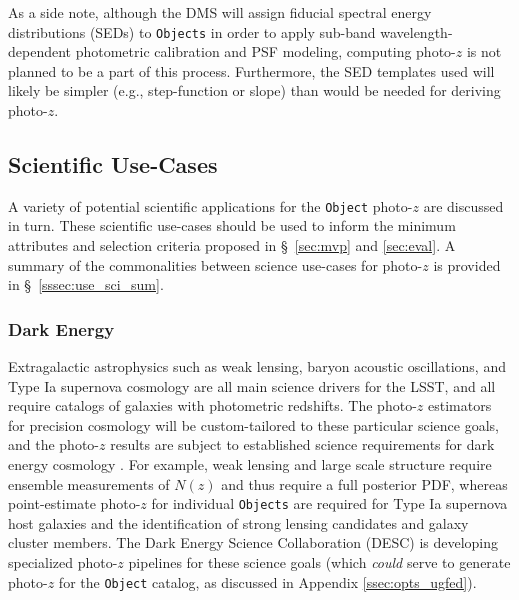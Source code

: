 \documentclass[DM,lsstdraft,toc]{lsstdoc}
\begin{document}
As a side note, although the DMS will assign fiducial spectral energy distributions (SEDs) to {\tt Objects} in order to apply sub-band wavelength-dependent photometric calibration and PSF modeling, computing photo-$z$ is not planned to be a part of this process.
Furthermore, the SED templates used will likely be simpler (e.g., step-function or slope) than would be needed for deriving photo-$z$.

\subsection{Scientific Use-Cases}\label{ssec:use_sci}

A variety of potential scientific applications for the {\tt Object} photo-$z$ are discussed in turn. 
These scientific use-cases should be used to inform the minimum attributes and selection criteria proposed in \S~\ref{sec:mvp} and \ref{sec:eval}.
A summary of the commonalities between science use-cases for photo-$z$ is provided in \S~\ref{sssec:use_sci_sum}.

\subsubsection{Dark Energy}\label{sssec:use_sci_de}
Extragalactic astrophysics such as weak lensing, baryon acoustic oscillations, and Type Ia supernova cosmology are all main science drivers for the LSST, and all require catalogs of galaxies with photometric redshifts.
The photo-$z$ estimators for precision cosmology will be custom-tailored to these particular science goals, and the photo-$z$ results are subject to established science requirements for dark energy cosmology \citep{2018arXiv180901669T}.
For example, weak lensing and large scale structure require ensemble measurements of $N(z)$ and thus require a full posterior PDF, whereas point-estimate photo-$z$ for individual {\tt Objects} are required for Type Ia supernova host galaxies and the identification of strong lensing candidates and galaxy cluster members. 
The Dark Energy Science Collaboration (DESC) is developing specialized photo-$z$ pipelines for these science goals (which {\it could} serve to generate photo-$z$ for the {\tt Object} catalog, as discussed in Appendix \ref{ssec:opts_ugfed}).
\end{document}
